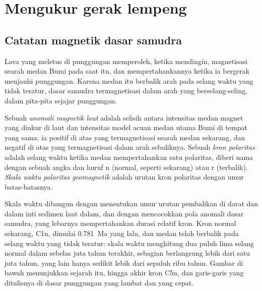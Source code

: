 \section{Mengukur gerak lempeng}

\subsection*{Catatan magnetik dasar samudra}

Lava yang meletus di punggungan memperoleh, ketika mendingin, magnetisasi searah medan Bumi pada saat itu, dan mempertahankannya ketika ia bergerak menjauhi punggungan. Karena medan itu berbalik arah pada selang waktu yang tidak teratur, dasar samudra termagnetisasi dalam arah yang berselang-seling, dalam pita-pita sejajar punggungan.

\begin{definition}\label{def:b1:plate-kinematics:magnetic-anomaly}
Sebuah \emph{anomali magnetik laut} adalah selisih antara intensitas medan magnet yang diukur di laut dan intensitas model acuan medan utama Bumi di tempat yang sama: ia positif di atas  yang termagnetisasi searah medan sekarang, dan negatif di atas  yang termagnetisasi dalam arah sebaliknya. Sebuah \emph{kron polaritas} adalah selang waktu ketika medan mempertahankan satu polaritas, diberi nama dengan sebuah angka dan huruf n (normal, seperti sekarang) atau r (terbalik). \emph{Skala waktu polaritas geomagnetik} adalah urutan kron polaritas dengan umur batas-batasnya.
\end{definition}

Skala waktu dibangun dengan menentukan umur urutan pembalikan di darat dan dalam inti sedimen laut dalam, dan dengan mencocokkan pola anomali dasar samudra, yang lebarnya mempertahankan durasi relatif kron. Kron normal sekarang, C1n, dimulai \qty{0.781}{Ma} yang lalu, dan medan telah berbalik pada selang waktu yang tidak teratur: skala waktu menghitung dua puluh lima selang normal dalam sebelas juta tahun terakhir, sebagian berlangsung lebih dari satu juta tahun, yang lain hanya sedikit lebih dari sepuluh ribu tahun. Gambar di bawah menunjukkan sejarah itu, hingga akhir kron C5n, dan garis-garis yang ditulisnya di dasar punggungan yang lambat dan yang cepat.

